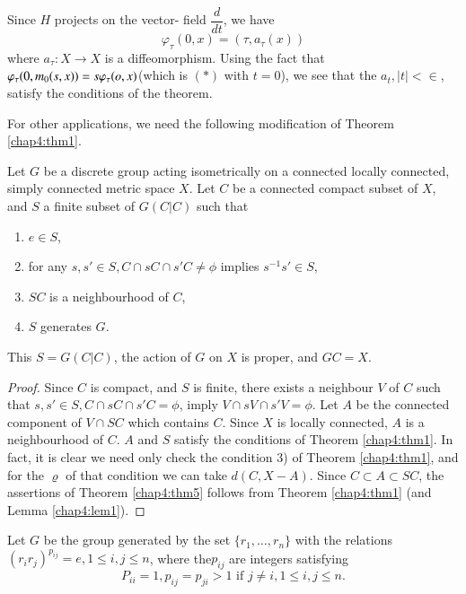 Since $H$ projects on the vector- field $\dfrac{d}{dt}$, we have 
$$
\varphi_\tau(0,x)=(\tau, a_\tau(x))
$$
where $a_\tau: X \to X$ is a diffeomorphism. Using the fact that
$\varphi_\tau(0, m_0\break (s,x))= s \varphi_\tau(o,x)$\pageoriginale (which is $(*)$
with $t =0$), we see that the $a_t, |t| < \in$, satisfy the
conditions of the theorem. 

For other  applications, we need the following modification of Theorem
\ref{chap4:thm1}.  

\begin{thm}\label{chap4:thm5}%
  Let $G$ be a discrete group acting isometrically on a connected
  locally connected, simply connected metric space $X$. Let $C$ be a
  connected compact subset of $X$, and $S$ a finite subset of $G(C|C)$
  such that 
  \begin{enumerate}[\rm(i)]
  \item $e \in S$,
  \item for any  $s, s' \in S, C \cap s C \cap s' C \neq \phi$ implies
    $s^{-1} s' \in S$,  
  \item $SC$ is a neighbourhood of $C$, 
  \item $S$ generates $G$.
  \end{enumerate}
  This $S =G(C|C)$, the action of $G$ on $X$ is proper, and  $GC=X$.
\end{thm}
 
\begin{proof}
  Since $C$ is compact, and $S$ is finite, there exists a neighbour $V$
  of $C$ such that $s, s' \in S, C \cap s C \cap s' C=\phi$, imply $V
  \cap sV \cap s' V= \phi$. Let  $A$ be the connected component of $V
  \cap SC$ which contains $C$. Since  $X$ is locally  connected, $A$ is a
  neighbourhood of $C$. $A$ and $S$ satisfy the conditions of Theorem
  \ref{chap4:thm1}. In  fact, it is clear we need only check the condition 3) of
  Theorem \ref{chap4:thm1},  and for the $\varrho$ of that condition we can take
  $d(C,X-A)$. Since $C \subset A \subset SC$, the  assertions of
  Theorem \ref{chap4:thm5} follows from Theorem \ref{chap4:thm1} (and
  Lemma \ref{chap4:lem1}).  
\end{proof}
 
\begin{thm}\label{chap4:thm6}%
  Let $G$ be the group generated by the set $\{r_1,
  \ldots, r_n\}$ with the relations $(r_ir_j)^{p_{ij}}=e,1 \le i,j
  \le n$, where the\pageoriginale $p_{ij}$ are integers satisfying 
  $$
  P_{ii} =1, p_{ij} =p_{ji} > 1 \text{ if } j \neq i, 1 \le i, j \le n.
  $$ 
\end{thm} 

